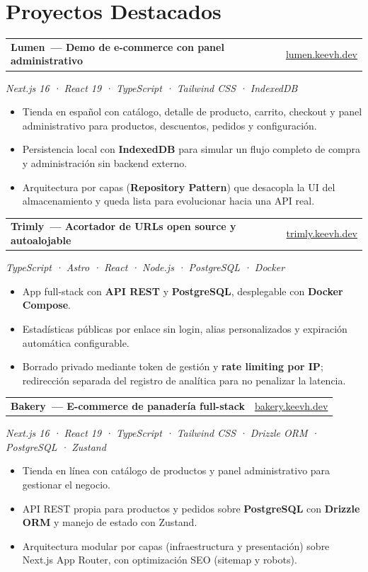 \documentclass[legalpaper,11pt]{article}
\makeatletter
\newcommand{\entry}[2]{%
  \noindent\begin{tabularx}{\textwidth}{@{}X@{}r@{}}
    \textbf{#1} & {\color{muted}\small #2}
  \end{tabularx}\par
}
\newcommand{\stack}[1]{{\color{accentdark}\small\itshape #1}\par\vspace{2pt}}
\makeatother
\begin{document}
\section{Proyectos Destacados}

\entry{Lumen~\textcolor{muted}{\small— Demo de e-commerce con panel administrativo}}{\href{https://lumen.keevh.dev/}{\color{accentdark}\small lumen.keevh.dev}}
\stack{Next.js 16 · React 19 · TypeScript · Tailwind CSS · IndexedDB}
\begin{itemize}
  \small
  \item Tienda en español con catálogo, detalle de producto, carrito, checkout y panel administrativo para productos, descuentos, pedidos y configuración.
  \item Persistencia local con \textbf{IndexedDB} para simular un flujo completo de compra y administración sin backend externo.
  \item Arquitectura por capas (\textbf{Repository Pattern}) que desacopla la UI del almacenamiento y queda lista para evolucionar hacia una API real.
\end{itemize}
\vspace{2.5pt}

\entry{Trimly~\textcolor{muted}{\small— Acortador de URLs open source y autoalojable}}{\href{https://trimly.keevh.dev}{\color{accentdark}\small trimly.keevh.dev}}
\stack{TypeScript · Astro · React · Node.js · PostgreSQL · Docker}
\begin{itemize}
  \small
  \item App full-stack con \textbf{API REST} y \textbf{PostgreSQL}, desplegable con \textbf{Docker Compose}.
  \item Estadísticas públicas por enlace sin login, alias personalizados y expiración automática configurable.
  \item Borrado privado mediante token de gestión y \textbf{rate limiting por IP}; redirección separada del registro de analítica para no penalizar la latencia.
\end{itemize}
\vspace{2.5pt}

\entry{Bakery~\textcolor{muted}{\small— E-commerce de panadería full-stack}}{\href{https://bakery.keevh.dev}{\color{accentdark}\small bakery.keevh.dev}}
\stack{Next.js 16 · React 19 · TypeScript · Tailwind CSS · Drizzle ORM · PostgreSQL · Zustand}
\begin{itemize}
  \small
  \item Tienda en línea con catálogo de productos y panel administrativo para gestionar el negocio.
  \item API REST propia para productos y pedidos sobre \textbf{PostgreSQL} con \textbf{Drizzle ORM} y manejo de estado con Zustand.
  \item Arquitectura modular por capas (infraestructura y presentación) sobre Next.js App Router, con optimización SEO (sitemap y robots).
\end{itemize}
\vspace{2.5pt}
\end{document}
